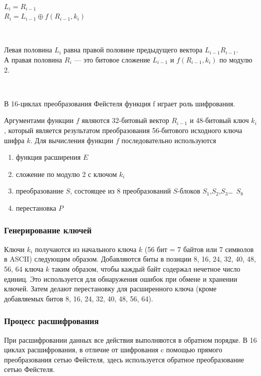 \documentclass[a4paper]{report}
\begin{document}
~

$L_i = R_{i-1}$ \\
$R_{i}=L_{i-1}\oplus f(R_{i-1},k_{i})$ 

~

Левая половина $L_{i}$ равна правой половине предыдущего вектора $L_{i-1}R_{i-1}$.\\ А правая половина $R_i$ — это битовое сложение $L_{i-1}$ и $f(R_{i-1},k_{i})$ по модулю 2.

~

В 16-циклах преобразования Фейстеля функция f играет роль шифрования.

Аргументами функции $f$ являются 32-битовый вектор $R_{i-1}$ и 48-битовый ключ $k_{i}$, который является результатом преобразования 56-битового исходного ключа шифра $k$. Для вычисления функции $f$ последовательно используются

\begin{enumerate}
\item функция расширения $E$
\item сложение по модулю 2 с ключом $k_{i}$
\item преобразование $S$, состоящее из 8 преобразований $S$-блоков ${S} _{1}$,${S} _{2}$,${S} _{3}$\ldots \ ${S} _{8}$
\item перестановка $P$
\end{enumerate}


\subsubsection{Генерирование ключей}
Ключи $k_{i}$ получаются из начального ключа $k$ (56 бит = 7 байтов или 7 символов в ASCII) следующим образом. Добавляются биты в позиции 8, 16, 24, 32, 40, 48, 56, 64 ключа $k$ таким образом, чтобы каждый байт содержал нечетное число единиц. Это используется для обнаружения ошибок при обмене и хранении ключей. Затем делают перестановку для расширенного ключа (кроме добавляемых битов 8, 16, 24, 32, 40, 48, 56, 64).

\subsubsection{Процесс расшифрования}
При расшифровании данных все действия выполняются в обратном порядке. В 16 циклах расшифрования, в отличие от шифрования c помощью прямого преобразования сетью Фейстеля, здесь используется обратное преобразование сетью Фейстеля.

~
\end{document}
